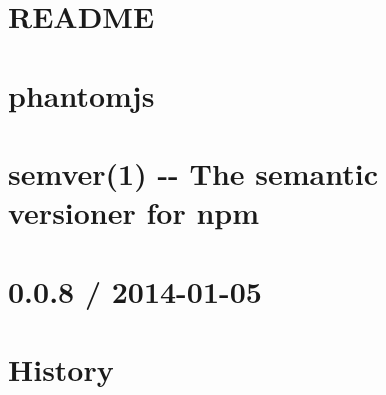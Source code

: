 \documentclass[twoside]{book}
\newcommand{\+}{\discretionary{\mbox{\scriptsize$\hookleftarrow$}}{}{}}
\begin{document}
\chapter{R\+E\+A\+D\+M\+E}
\label{md__c_1__users_martin__documents__git_hub_visual_studio__bachelor__wis_r__wis_r_node_modules_gru00f7ef7ca41370d660911bcdd802262e}
\hypertarget{md__c_1__users_martin__documents__git_hub_visual_studio__bachelor__wis_r__wis_r_node_modules_gru00f7ef7ca41370d660911bcdd802262e}{}

\chapter{phantomjs}
\label{md__c_1__users_martin__documents__git_hub_visual_studio__bachelor__wis_r__wis_r_node_modules_gru69e2efa7917e95ee02e5c07f007c3877}
\hypertarget{md__c_1__users_martin__documents__git_hub_visual_studio__bachelor__wis_r__wis_r_node_modules_gru69e2efa7917e95ee02e5c07f007c3877}{}

\chapter{semver(1) -\/-\/ The semantic versioner for npm}
\label{md__c_1__users_martin__documents__git_hub_visual_studio__bachelor__wis_r__wis_r_node_modules_grufbaf4757c4a099f46a6b632ba0a92591}
\hypertarget{md__c_1__users_martin__documents__git_hub_visual_studio__bachelor__wis_r__wis_r_node_modules_grufbaf4757c4a099f46a6b632ba0a92591}{}

\chapter{0.0.8 / 2014-\/01-\/05}
\label{md__c_1__users_martin__documents__git_hub_visual_studio__bachelor__wis_r__wis_r_node_modules_grue17a8a5cb21fc295d4ccb196045ec21a}
\hypertarget{md__c_1__users_martin__documents__git_hub_visual_studio__bachelor__wis_r__wis_r_node_modules_grue17a8a5cb21fc295d4ccb196045ec21a}{}

\chapter{History}
\label{md__c_1__users_martin__documents__git_hub_visual_studio__bachelor__wis_r__wis_r_node_modules_gru2cd18aa09e1bb1e3992ada8a6e54c7d2}
\hypertarget{md__c_1__users_martin__documents__git_hub_visual_studio__bachelor__wis_r__wis_r_node_modules_gru2cd18aa09e1bb1e3992ada8a6e54c7d2}{}

\end{document}
